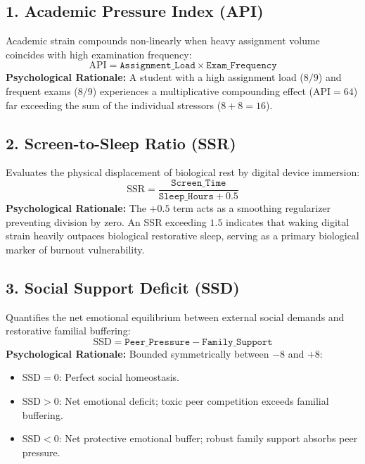 \documentclass[12pt,a4paper,oneside]{report}
\begin{document}
\subsection{1. Academic Pressure Index (API)}
Academic strain compounds non-linearly when heavy assignment volume coincides with high examination frequency:
\begin{equation}
    \text{API} = \texttt{Assignment\_Load} \times \texttt{Exam\_Frequency}
    \label{eq:api_formulation}
\end{equation}
\textbf{Psychological Rationale:} A student with a high assignment load ($8/9$) and frequent exams ($8/9$) experiences a multiplicative compounding effect ($\text{API} = 64$) far exceeding the sum of the individual stressors ($8+8=16$).

\subsection{2. Screen-to-Sleep Ratio (SSR)}
Evaluates the physical displacement of biological rest by digital device immersion:
\begin{equation}
    \text{SSR} = \frac{\texttt{Screen\_Time}}{\texttt{Sleep\_Hours} + 0.5}
    \label{eq:ssr_formulation}
\end{equation}
\textbf{Psychological Rationale:} The $+0.5$ term acts as a smoothing regularizer preventing division by zero. An SSR exceeding $1.5$ indicates that waking digital strain heavily outpaces biological restorative sleep, serving as a primary biological marker of burnout vulnerability.

\subsection{3. Social Support Deficit (SSD)}
Quantifies the net emotional equilibrium between external social demands and restorative familial buffering:
\begin{equation}
    \text{SSD} = \texttt{Peer\_Pressure} - \texttt{Family\_Support}
    \label{eq:ssd_formulation}
\end{equation}
\textbf{Psychological Rationale:} Bounded symmetrically between $-8$ and $+8$:
\begin{itemize}
    \item $\text{SSD} = 0$: Perfect social homeostasis.
    \item $\text{SSD} > 0$: Net emotional deficit; toxic peer competition exceeds familial buffering.
    \item $\text{SSD} < 0$: Net protective emotional buffer; robust family support absorbs peer pressure.
\end{itemize}
\end{document}
